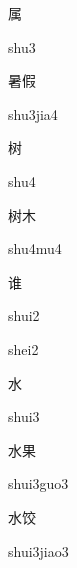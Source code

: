 \begin{multicols*}{2}
\begin{verbete}[shu3]{属}
\begin{pronuncia}{shu3}
\end{pronuncia}
\end{verbete}

\begin{verbete}{暑假}
\begin{pronuncia}{shu3jia4}
\end{pronuncia}
\end{verbete}

\begin{verbete}[shu4]{树}
\begin{pronuncia}{shu4}
\end{pronuncia}
\end{verbete}

\begin{verbete}[shu4mu4]{树木}
\begin{pronuncia}{shu4mu4}
\end{pronuncia}
\end{verbete}

\begin{verbete}[shui2]{谁}
\begin{pronuncia}{shui2}
\end{pronuncia}
\begin{pronuncia}{shei2}
\end{pronuncia}
\end{verbete}

\begin{verbete}[shui3]{水}
\begin{pronuncia}{shui3}
\end{pronuncia}
\end{verbete}

\begin{verbete}{水果}
\begin{pronuncia}{shui3guo3}
\end{pronuncia}
\end{verbete}

\begin{verbete}{水饺}
\begin{pronuncia}{shui3jiao3}
\end{pronuncia}
\end{verbete}


\end{multicols*}
